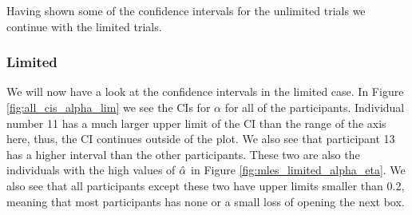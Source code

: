 Having shown some of the confidence intervals for the unlimited trials we continue with the limited trials.












\subsubsection{Limited}
We will now have a look at the confidence intervals in the limited case. In Figure \ref{fig:all_cis_alpha_lim} we see the CIs for $\alpha$ for all of the participants. Individual number 11 has a much larger upper limit of the CI than the range of the axis here, thus, the CI continues outside of the plot. We also see that participant 13 has a higher interval than the other participants. These two are also the individuals with the high values of $\hat{\alpha}$ in Figure \ref{fig:mles_limited_alpha_eta}. We also see that all participants except these two have upper limits smaller than 0.2, meaning that most participants has none or a small loss of opening the next box. 
